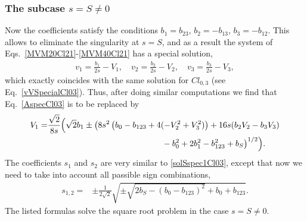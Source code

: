 \documentclass{birkjour}
\newcommand{\cl}[2]{\ensuremath{\mathit{Cl}_{#1,#2}}}
\begin{document}
\subsubsection{The subcase $s=S\neq 0$}
Now the coefficients satisfy the conditions $b_1 =b_{23}$, $b_2 =
-b_{13}$,  $b_3= - b_{12}$.  This  allows to eliminate the
singularity at $s=S$, and as a result the system of
Eqs.~\eqref{MVM20Cl21}-\eqref{MVM40Cl21} has a special solution,
\begin{equation}\begin{split}\label{vVSpecialCl21}
v_{1}= \frac{b_{1}}{2 s}-V_{1},\quad v_{2}= \frac{b_{2}}{2 s}-V_{2},\quad v_{3}= \frac{b_{3}}{2 s}-V_{3},
\end{split}\end{equation}
which exactly coincides with the same solution for \cl{0}{3} (see
Eq.~\eqref{vVSpecialCl03}). Thus, after doing similar computations
we find that Eq.~\eqref{AspecCl03} is to be replaced by
\begin{equation}\begin{split}\label{AspecCl21}
  V_{1}=& \frac{\sqrt{2}}{8 s}\Bigl(\sqrt{2} b_{1}\pm \bigl(8 s^2 \left(b_{0}-b_{123}+4 (-V_{2}^2+V_{3}^2)\right)+16 s (b_{2} V_{2}-b_{3} V_{3})\\
  &\phantom{\bigl(-8 s^2 \left(b_{0}-b_{123}+4 (V_{2}^2+V_{3}^2)\right)}
  -b_{0}^2+2 b_{1}^2-b_{123}^2+b_{S}\bigr)^{1/2}\Bigr).
\end{split}\end{equation}
The coefficients $s_{1}$ and   $s_{2}$ are very similar to
\eqref{solSspec1Cl03}, except that now we need to take into
account all passible sign combinations,
\begin{equation}\begin{split}\label{solSspec1Cl21}
s_{1,2} =& \pm\tfrac{1}{2\sqrt{2}}\sqrt{\pm\sqrt{2
b_{S}-(b_{0}-b_{123})^2}+b_{0}+b_{123}}.
\end{split}\end{equation}
The listed formulas  solve the square root problem in the case
$s=S\neq 0$.
\end{document}
